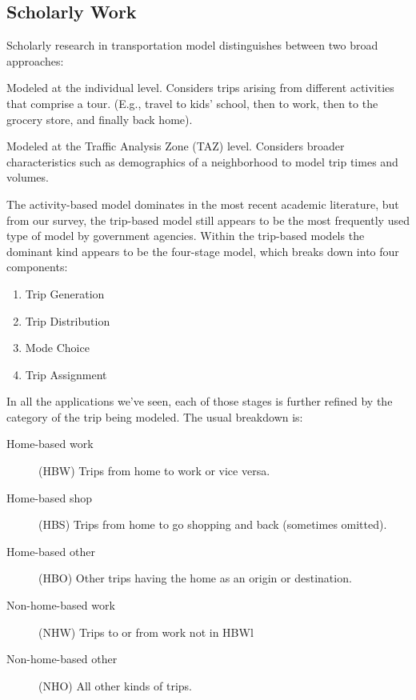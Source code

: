 
\subsection{Scholarly Work}
Scholarly research in transportation model distinguishes between two
broad approaches: \cite{kitamura1988}

\begin{description}[style=nextline]
    \item[Activity-based] Modeled at the individual level. Considers
  trips arising from different activities that comprise a tour. (E.g.,
  travel to kids' school, then to work, then to the grocery store, and
  finally back home). \cite{kitamura1988}
    \item[Trip-based] Modeled at the Traffic Analysis Zone (TAZ)
  level. Considers broader characteristics such as demographics of a
  neighborhood to model trip times and volumes.\cite{murthy01}
\end{description}

The activity-based model dominates in the most recent academic
literature, but from our survey, the trip-based model still appears to
be the most frequently used type of model by government
agencies. Within the trip-based models the dominant kind appears to be
the four-stage model, which breaks down into four components:
\cite{murthy01}

\begin{enumerate}
    \item Trip Generation
    \item Trip Distribution
    \item Mode Choice
    \item Trip Assignment
\end{enumerate}

In all the applications we've seen, each of those stages is further
refined by the category of the trip being modeled. The usual breakdown
is:

\begin{description}
  \item[Home-based work] (HBW) Trips from home to work or vice versa.
  \item[Home-based shop] (HBS) Trips from home to go shopping and back
(sometimes omitted).
  \item[Home-based other](HBO) Other trips having the home as an
origin or destination.
  \item[Non-home-based work] (NHW) Trips to or from work not in HBWl
  \item[Non-home-based other](NHO) All other kinds of trips.
\end{description}

